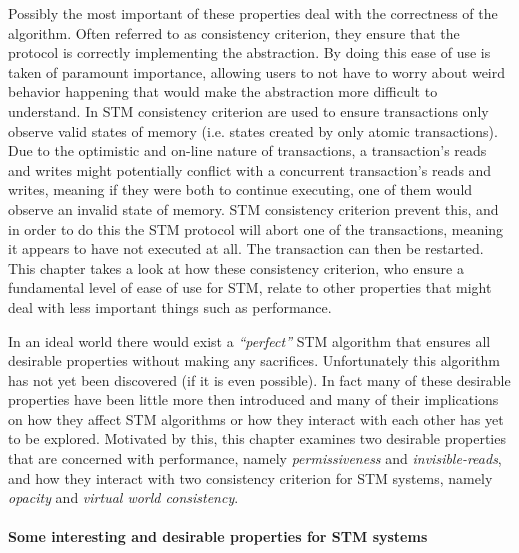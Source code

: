 Possibly the most important of these properties deal with the correctness of the algorithm.
Often referred to as consistency criterion, they ensure that the protocol is correctly implementing
the abstraction.
By doing this ease of use is taken of paramount importance, allowing users to not have to worry about weird behavior happening that would make
the abstraction more difficult to understand.
In STM consistency criterion are used to ensure transactions only observe valid states of
memory (i.e. states created by only atomic transactions).
Due to the optimistic and on-line nature of transactions, a transaction's reads and writes
might potentially conflict with a concurrent transaction's reads and writes, meaning
if they were both to continue executing, one of them would observe an invalid state of memory.
STM consistency criterion prevent this, and in order to do this the STM protocol will abort
one of the transactions, meaning it appears to have not executed at all.
The transaction can then be restarted.
This chapter takes a look at how these consistency criterion, who ensure a fundamental level of ease of use
for STM, relate to other properties that might deal with less important things such as performance.



In an ideal world there would exist a \emph{``perfect''} STM algorithm that ensures all desirable properties
without making any sacrifices.
Unfortunately this algorithm has not yet been discovered (if it is even possible).
In fact many of these desirable properties have been little more then introduced and many of their implications
on how they affect STM algorithms or how they interact with each other has yet to be explored.
Motivated by this, this chapter examines two desirable properties that are concerned with performance,
namely \emph{permissiveness} and \emph{invisible-reads}, and how they interact with two consistency
criterion for STM systems, namely \emph{opacity} and \emph{virtual world consistency}.


\paragraph{Some interesting and desirable properties for STM systems}

